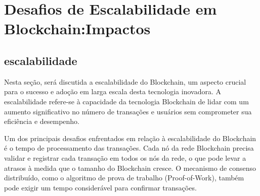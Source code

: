 \chapter{Desafios de Escalabilidade em Blockchain:Impactos }
\label{chapter_desafios_de_escalabilidade}




\section{escalabilidade}
Nesta seção, será discutida a escalabilidade do Blockchain, um aspecto crucial para o sucesso e adoção em larga escala desta tecnologia inovadora. A escalabilidade refere-se à capacidade da tecnologia Blockchain de lidar com um aumento significativo no número de transações e usuários sem comprometer sua eficiência e desempenho.


Um dos principais desafios enfrentados em relação à escalabilidade do Blockchain é o tempo de processamento das transações. Cada nó da rede Blockchain precisa validar e registrar cada transação em todos os nós da rede, o que pode levar a atrasos à medida que o tamanho do Blockchain cresce. O mecanismo de consenso distribuído, como o algoritmo de prova de trabalho (Proof-of-Work), também pode exigir um tempo considerável para confirmar transações.


